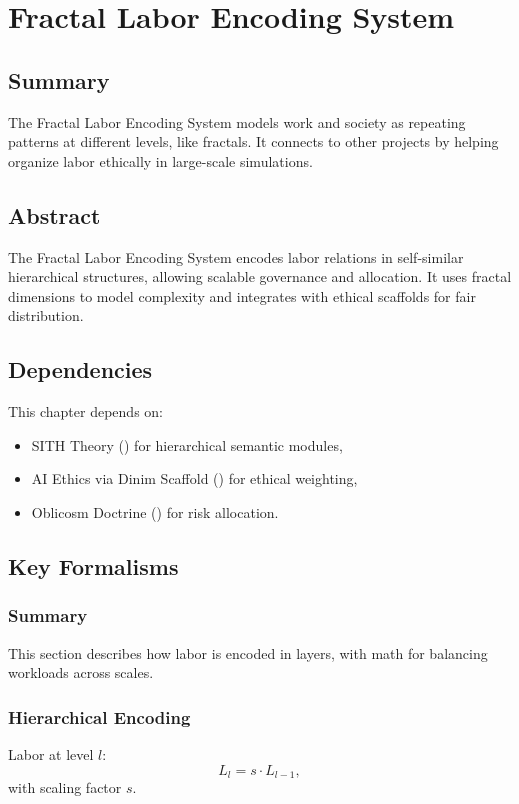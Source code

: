 \documentclass[11pt,oneside]{memoir}
\theoremstyle{plain}
\begin{document}
\chapter{Fractal Labor Encoding System}
\label{sec:fractal_labor}

\section{Summary}
The Fractal Labor Encoding System models work and society as repeating patterns at different levels, like fractals. It connects to other projects by helping organize labor ethically in large-scale simulations.

\section{Abstract}
The Fractal Labor Encoding System encodes labor relations in self-similar hierarchical structures, allowing scalable governance and allocation. It uses fractal dimensions to model complexity and integrates with ethical scaffolds for fair distribution.

\section{Dependencies}
This chapter depends on:
\begin{itemize}
    \item SITH Theory () for hierarchical semantic modules,
    \item AI Ethics via Dinim Scaffold () for ethical weighting,
    \item Oblicosm Doctrine () for risk allocation.
\end{itemize}

\section{Key Formalisms}
\subsection{Summary}
This section describes how labor is encoded in layers, with math for balancing workloads across scales.

\subsection{Hierarchical Encoding}
Labor at level \(l\):
\begin{equation}
    L_l = s \cdot L_{l-1},
\end{equation}
with scaling factor \(s\).
\end{document}
